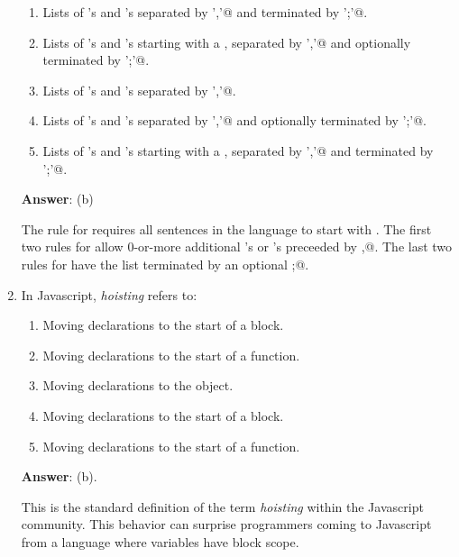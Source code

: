 \documentclass[12pt]{article}
\begin{document}
\begin{enumerate}
\begin{enumerate}
\item Lists of \verb@ID@'s and \verb@NUM@'s 
  separated by \verb@','@ and terminated by \verb@';'@.
  
\item Lists of \verb@ID@'s and \verb@NUM@'s starting with a \verb@ID@,
  separated by \verb@','@ and optionally terminated by \verb@';'@.

\item Lists of \verb@ID@'s and \verb@NUM@'s 
  separated by \verb@','@.
  
\item Lists of \verb@ID@'s and \verb@NUM@'s 
  separated by \verb@','@ and optionally terminated by \verb@';'@.
  
\item Lists of \verb@ID@'s and \verb@NUM@'s starting with a \verb@ID@,
  separated by \verb@','@ and terminated by \verb@';'@.
    
\end{enumerate}

\textbf{Answer}: (b)

The rule for \verb@list@ requires all sentences in the language to
start with \verb@ID@.  The first two rules for \verb@tail@ allow 0-or-more
additional \verb@ID@'s or \verb@NUM@'s preceeded by \verb@,@.
The last two rules for \verb@tail@ have the list terminated by
an optional \verb@;@.

\item In Javascript, \textit{hoisting} refers to:
\begin{enumerate}

\item Moving \verb@var@ declarations to the start
  of a block.

\item Moving \verb@var@ declarations to the start
  of a function.

\item Moving \verb@var@ declarations to the \verb@window@ object.

\item Moving \verb@let@ declarations to the start
  of a block.

\item Moving \verb@let@ declarations to the start
  of a function.

\end{enumerate}

\textbf{Answer}: (b).

This is the standard definition of the term \textit{hoisting} within
the Javascript community.  This behavior can surprise programmers
coming to Javascript from a language where variables have block scope.


\end{enumerate}
\end{document}

